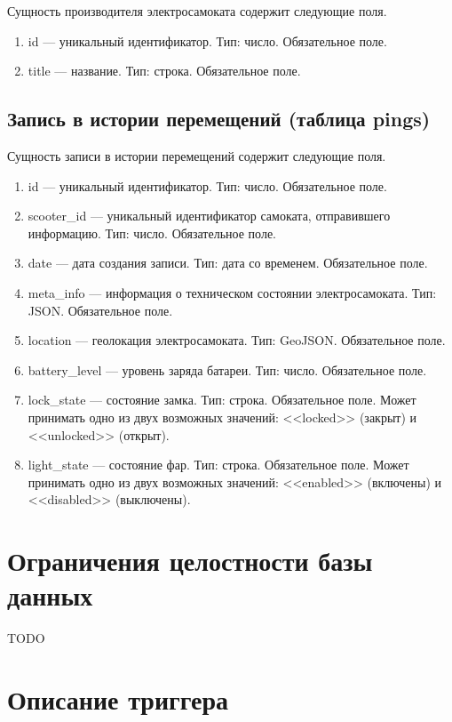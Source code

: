 Сущность производителя электросамоката содержит следующие поля.

\begin{enumerate}
    \item id --- уникальный идентификатор. Тип: число. Обязательное поле.
    \item title --- название. Тип: строка. Обязательное поле.
\end{enumerate}

\subsection{Запись в истории перемещений (таблица pings)}

Сущность записи в истории перемещений содержит следующие поля.

\begin{enumerate}
    \item id --- уникальный идентификатор. Тип: число. Обязательное поле.
    \item scooter\_id --- уникальный идентификатор самоката, отправившего информацию. Тип: число. Обязательное поле.
    \item date --- дата создания записи. Тип: дата со временем. Обязательное поле.
    \item meta\_info --- информация о техническом состоянии электросамоката. Тип: JSON. Обязательное поле.
    \item location --- геолокация электросамоката. Тип: GeoJSON. Обязательное поле.
    \item battery\_level --- уровень заряда батареи. Тип: число. Обязательное поле.
    \item lock\_state --- состояние замка. Тип: строка. Обязательное поле. Может принимать одно из двух возможных значений: <<locked>> (закрыт) и <<unlocked>> (открыт).
    \item light\_state --- состояние фар. Тип: строка. Обязательное поле. Может принимать одно из двух возможных значений: <<enabled>> (включены) и <<disabled>> (выключены).
\end{enumerate}

\section{Ограничения целостности базы данных}

TODO

\section{Описание триггера}

